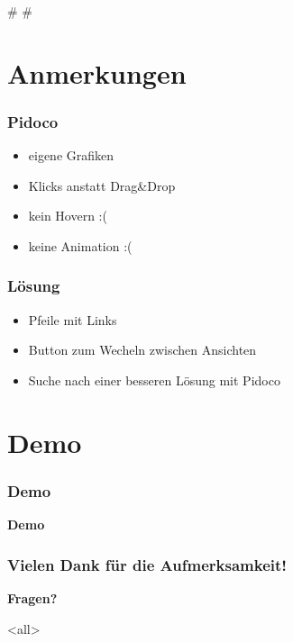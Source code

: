 
\def\mytitle{File Network: Fortschrittsberichte}
\def\myauthor{Anastasia Kazakova, Bengt Lüers}
\def\latexmode{beamer}
\def\latexxslt{beamer}
\def\theme{keynote-IntSysTheme}

\# \#

\section{Anmerkungen}
\label{anmerkungen}

\begin{frame}

\frametitle{Pidoco}
\label{pidoco}

\begin{itemize}
\item eigene Grafiken

\item Klicks anstatt Drag\&Drop

\item kein Hovern :(

\item keine Animation :(

\end{itemize}

\end{frame}

\begin{frame}

\frametitle{Lösung}
\label{lsung}

\begin{itemize}
\item Pfeile mit Links

\item Button zum Wecheln zwischen Ansichten

\item Suche nach einer besseren Lösung mit Pidoco

\end{itemize}

\end{frame}

\section{Demo}
\label{demo}

\begin{frame}

\frametitle{Demo}
\label{demo}

\textbf{Demo}

\end{frame}

\begin{frame}

\frametitle{Vielen Dank für die Aufmerksamkeit!}
\label{vielendankfrdieaufmerksamkeit}

\textbf{Fragen?}

\end{frame}

\mode<all>


\mode*

